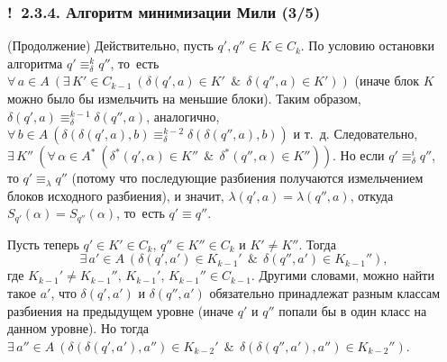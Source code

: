 \documentclass[mathserif,12pt,aspectratio=169]{beamer}
\def\A#1#2{\forall\,#1\ \left(#2\right)}
\def\E#1#2{\exists\,#1\ \left(#2\right)}
\def\And{\operatorname{\,\&\,}}
\def\Ok{{\color{green}\textbf{!}\ }}
\begin{document}
\begin{frame}
\frametitle{\Ok 2.3.4. Алгоритм минимизации Мили (3/5)}
\begin{ground} (Продолжение)
Действительно, пусть $q', q'' \in K\in C_k$.
 По условию остановки алгоритма $q'\equiv_\delta^k q''$, то~есть $\A{a\in A}
 {\E{K'\in C_{k-1}}{\delta(q', a)\in K' \And \delta(q'', a)\in K'}}$
 (иначе блок $K$ можно было бы
 измельчить на меньшие блоки).
 Таким образом, \\$\delta(q', a) \equiv_\delta^{k-1} \delta(q'', a)$,
 аналогично, $\A{b\in A}{\delta(\delta(q',a),b) \equiv_\delta^{k-2}
 \delta(\delta(q'',a),b)}$ и т.~д.
 Следо\-ва\-тельно,
$
\E{ K''}{ \A{ \alpha\in A^*}{\delta^*(q',\alpha)\in K''\And  \delta^*(q'',
 \alpha) \in K''}}.
 $
 Но если $q'\equiv_\delta^i q''$, \\то $q'\equiv_\lambda q''$
 (потому что последующие разбиения получаются измельчением блоков
 исходного разбиения), и значит, $\lambda(q',a)= \lambda(q'',a)$,
 откуда
 $S_{q'}(\alpha)= S_{q''}(\alpha)$,
 то~есть $q'\equiv q''$.

 Пусть теперь $q'\in K'\in C_k$, $q''\in K'' \in C_k$ и $K'\neq
 K''$.
Тогда
$$
\E{a'\in A}{\delta(q',a')\in K_{k-1}' \And  \delta
(q'',a')\in K_{k-1}''},
$$
где $K_{k-1}'\neq K_{k-1}''$, $K_{k-1}'$,
$K_{k-1}'' \in C_{k-1}$. Другими словами, можно найти такое $a'$,
что $\delta(q', a')$ и $\delta(q'', a')$ обязательно принадлежат
разным классам разбиения на предыдущем уровне (иначе $q'$ и
$q''$ попали бы в один класс на данном уровне).
 Но тогда\\
$
\E{a''\in A}{ \delta\left(\delta(q', a'), a''\right)\in K_{k-2}'\And
              \delta\left(\delta(q'',a'),a''\right)\in K_{k-2}''}.
$
\end{ground}
\end{frame}
\end{document}
